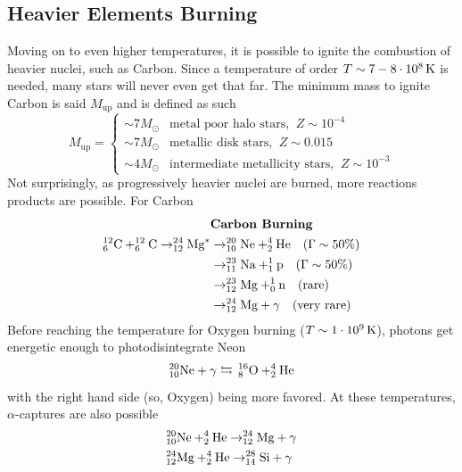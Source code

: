 \subsection{Heavier Elements Burning}
Moving on to even higher temperatures, it is possible to ignite the combustion of heavier nuclei, such as Carbon. Since a temperature of order $T\sim 7-8\power{10}{8}\unit{K}$ is needed, many stars will never even get that far. The minimum mass to ignite Carbon is said $M_{\text{up}}$ and is defined as such
\begin{equation*}
    M_{\text{up}}=
        \left\{
    \begin{array}{ll}
            \sim 7M_{\odot} & \text{metal poor halo stars,}\;\;Z\sim10^{-4}\\
            \sim 7M_{\odot} & \text{metallic disk stars,}\;\;Z\sim 0.015\\
            \sim 4M_{\odot} & \text{intermediate metallicity stars,}\;\;Z\sim 10^{-3}
    \end{array}
        \right.
\end{equation*}
Not surprisingly, as progressively heavier nuclei are burned, more reactions products are possible. For Carbon
\begin{align*}
    & \text{\textbf{Carbon Burning}}\\
    \element{C}{12}{6}+\element{C}{12}{6}\to\element{Mg}{24}{12}^{*}&\to\element{Ne}{20}{10}+\element{He}{4}{2}\quad (\Gamma \sim 50\%)\\
    & \to \element{Na}{23}{11}+\element{p}{1}{1}\quad (\Gamma \sim 50\%)\\
    & \to \element{Mg}{23}{12}+\element{n}{1}{0}\quad (\text{rare})\\
    & \to \element{Mg}{24}{12}+\gamma\quad (\text{very rare})
\end{align*}
Before reaching the temperature for Oxygen burning ($T\sim1\power{10}{9}\unit{K}$), photons get energetic enough to photodisintegrate Neon
\begin{equation*}
    \element{Ne}{20}{10}+\gamma \leftrightarrows \,\element{O}{16}{8}+\element{He}{4}{2}
\end{equation*}
with the right hand side (so, Oxygen) being more favored. At these temperatures, $\alpha$-captures are also possible
\begin{align*}
    & \element{Ne}{20}{10}+\element{He}{4}{2}\to\element{Mg}{24}{12}+\gamma\\
    & \element{Mg}{24}{12}+\element{He}{4}{2}\to\element{Si}{28}{14}+\gamma
\end{align*}
